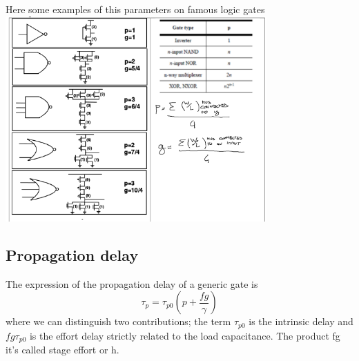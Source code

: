 \vspace{6mm}
\centering
Here some examples of this parameters on famous logic gates\\
\includegraphics[width=0.75\textwidth]{C6_5.png}\\
\raggedright

\subsection{Propagation delay}
The expression of the propagation delay of a generic gate is
\begin{equation}
\tau_p=\tau_{p0}\left(p+\frac{fg}{\gamma}\right)
\end{equation}
where we can distinguish two contributions; the term $\tau_{p0}$ is the intrinsic delay and $fg\tau_{p0}$  is the effort delay strictly related to the load capacitance. The product fg it's called stage effort or h.\\

